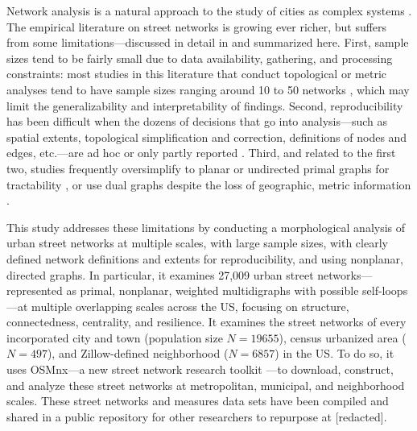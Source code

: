 \documentclass[Afour,sageh,times]{sagej}
\renewcommand{\cite}{\citep}
\begin{document}
Network analysis is a natural approach to the study of cities as complex systems \cite{masucci_random_2009}. The empirical literature on street networks is growing ever richer, but suffers from some limitations---discussed in detail in \cite{redacted_osmnx:_2017} and summarized here. First, sample sizes tend to be fairly small due to data availability, gathering, and processing constraints: most studies in this literature that conduct topological or metric analyses tend to have sample sizes ranging around 10 to 50 networks \cite{buhl_topological_2006, cardillo_structural_2006, barthelemy_modeling_2008, strano_urban_2013}, which may limit the generalizability and interpretability of findings. Second, reproducibility has been difficult when the dozens of decisions that go into analysis---such as spatial extents, topological simplification and correction, definitions of nodes and edges, etc.---are ad hoc or only partly reported \citep[e.g.,][]{porta_network_2006, strano_urban_2013}. Third, and related to the first two, studies frequently oversimplify to planar or undirected primal graphs for tractability \cite[e.g.,][]{buhl_topological_2006, cardillo_structural_2006, barthelemy_modeling_2008, masucci_random_2009}, or use dual graphs despite the loss of geographic, metric information \cite{batty_network_2005, jiang_integration_2002, ratti_space_2004, crucitti_centrality_2006, crucitti_centrality_2006-1}. 

This study addresses these limitations by conducting a morphological analysis of urban street networks at multiple scales, with large sample sizes, with clearly defined network definitions and extents for reproducibility, and using nonplanar, directed graphs. In particular, it examines 27,009 urban street networks---represented as primal, nonplanar, weighted multidigraphs with possible self-loops---at multiple overlapping scales across the US, focusing on structure, connectedness, centrality, and resilience. It examines the street networks of every incorporated city and town (population size $N=19655$), census urbanized area ($N=497$), and Zillow-defined neighborhood ($N=6857$) in the US. To do so, it uses OSMnx---a new street network research toolkit \cite{redacted_osmnx:_2017}---to download, construct, and analyze these street networks at metropolitan, municipal, and neighborhood scales. These street networks and measures data sets have been compiled and shared in a public repository for other researchers to repurpose at [redacted].
\end{document}
